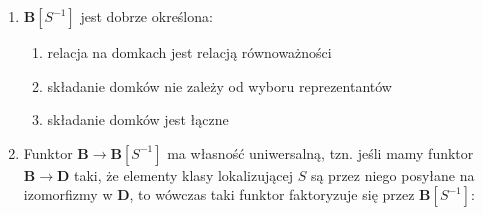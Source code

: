 \begin{theorem}
  \begin{enumerate}
    \item $\mathbf{B}[S^{-1}]$ jest dobrze określona:
      \begin{enumerate}
        \item relacja na domkach jest relacją równoważności 
        \item składanie domków nie zależy od wyboru reprezentantów
        \item składanie domków jest łączne
      \end{enumerate}
    \item Funktor $\mathbf{B}\to \mathbf{B}[S^{-1}]$ ma własność uniwersalną, tzn. jeśli mamy funktor $\mathbf{B}\to \mathbf{D}$ taki, że elementy klasy lokalizującej $S$ są przez niego posyłane na izomorfizmy w $\mathbf{D}$, to wówczas taki funktor faktoryzuje się przez $\mathbf{B}[S^{-1}]$:
      \begin{center}\end{center}
  \end{enumerate}
\end{theorem}


